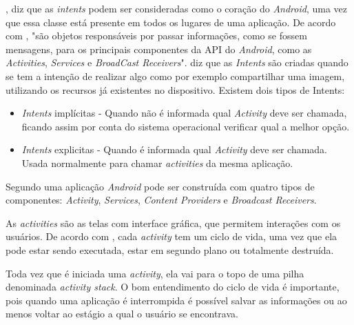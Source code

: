 	\par {}, diz que as \textit{intents} podem ser
consideradas como o coração do \textit{Android}, uma vez que essa classe está
presente em todos os lugares de uma aplicação. De acordo com
, "são objetos responsáveis por passar informações,
como se fossem mensagens, para os principais componentes da API do
\textit{Android}, como as \textit{Activities}, \textit{Services} e
\textit{BroadCast Receivers}".  diz que as
\textit{Intents} são criadas quando se tem a intenção de realizar algo como por
exemplo compartilhar uma imagem, utilizando os recursos já existentes no
dispositivo. Existem dois tipos de Intents:
	
	\begin{itemize}
	  
	  \item \textit{Intents} implícitas - Quando não é informada qual
	  \textit{Activity} deve ser chamada, ficando assim por conta do sistema
	  operacional verificar qual a melhor opção.
	  
	  \item \textit{Intents} explicitas - Quando é informada qual
	  \textit{Activity} deve ser chamada. Usada normalmente para chamar
	  \textit{activities} da mesma aplicação.
	  
	\end{itemize}
	
	\par Segundo  uma aplicação \textit{Android} pode ser
construída com quatro tipos de componentes: \textit{Activity},
\textit{Services}, \textit{Content Providers} e \textit{Broadcast Receivers}.

	\par As \textit{activities} são as telas com interface gráfica, que permitem
interações com os usuários. De acordo com , cada
\textit{activity} tem um ciclo de vida, uma vez que ela pode estar sendo
executada, estar em segundo plano ou totalmente destruída.

	\par Toda vez que é iniciada uma \textit{activity}, ela vai para o topo de uma
pilha denominada \textit{activity stack}. O bom entendimento do ciclo de vida é
importante, pois quando uma aplicação é interrompida é possível salvar as
informações ou ao menos voltar ao estágio a qual o usuário se encontrava.

